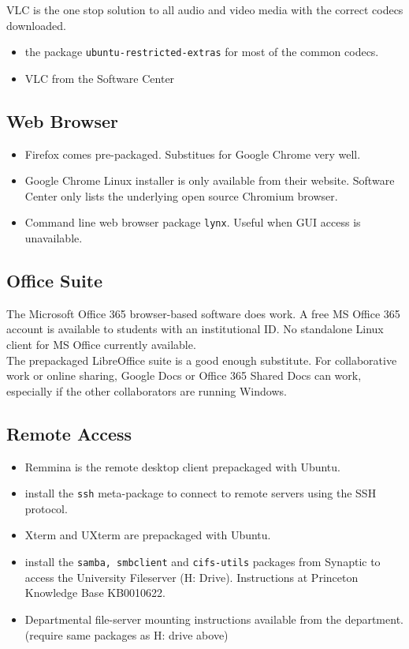 \documentclass[10pt,letterpaper,twocolumn]{article}
\begin{document}
VLC is the one stop solution to all audio and video media with the correct codecs downloaded.

\begin{itemize}
	\item the package \texttt{ubuntu-restricted-extras} for most of the common codecs.
	\item VLC from the Software Center
\end{itemize}

\subsection{Web Browser}

\begin{itemize}
	\item Firefox comes pre-packaged. Substitues for Google Chrome very well.
	\item Google Chrome Linux installer is only available from their website. Software Center only lists the underlying open source Chromium browser.
	\item Command line web browser package \texttt{lynx}. Useful when GUI access is unavailable.
	
\end{itemize}

\subsection{Office Suite}

The Microsoft Office 365 browser-based software does work. A free MS Office 365 account is available to students with an institutional ID. No standalone Linux client for MS Office currently available. \\

The prepackaged LibreOffice suite is a good enough substitute. For collaborative work or online sharing, Google Docs or Office 365 Shared Docs can work, especially if the other collaborators are running Windows.

\subsection{Remote Access}

\begin{itemize}
	\item Remmina is the remote desktop client prepackaged with Ubuntu.
	\item install the \texttt{ssh} meta-package to connect to remote servers using the SSH protocol.
	\item Xterm and UXterm are prepackaged with Ubuntu.
	\item install the \texttt{samba, smbclient} and \texttt{cifs-utils} packages from Synaptic to access the University Fileserver (H: Drive). Instructions at Princeton Knowledge Base KB0010622.
	\item Departmental file-server mounting instructions available from the department. (require same packages as H: drive above)
	 
\end{itemize}
\end{document}

